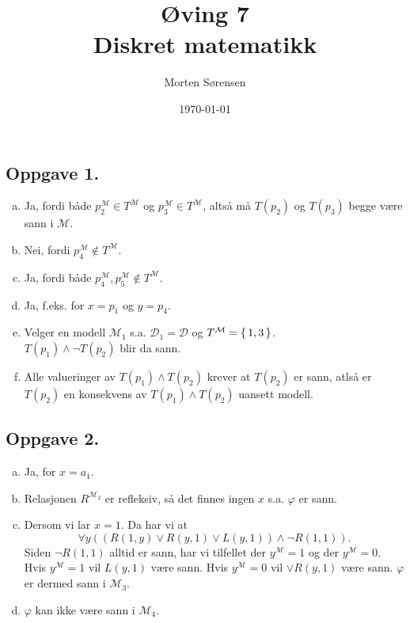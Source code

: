 \documentclass{article}
\title{\huge{Øving 7\\ Diskret matematikk}}
\author{Morten Sørensen}
\date{\today}
\begin{document}
\maketitle

\subsection*{Oppgave 1.}
\begin{enumerate}[(a)]
    \item {
        Ja, fordi både $p_2^{\mathcal{M}} \in T^{\mathcal{M}}$ og 
        $p_3^{\mathcal{M}} \in T^{\mathcal{M}}$, altså må $T(p_2)$ og $T(p_3)$ begge 
        være sann i $\mathcal{M}$.
    }
    \item {
        Nei, fordi $p_4^{\mathcal{M}} \notin T^{\mathcal{M}}$.
    }
    \item {
        Ja, fordi både $p_4^{\mathcal{M}}, p_5^{\mathcal{M}} \notin T^{\mathcal{M}}$.
    }
    \item {
        Ja, f.eks. for $x = p_1$ og $y = p_4$.
    }
    \item {
        Velger en modell $\mathcal{M}_1$ s.a. $\mathcal{D}_1 = \mathcal{D}$ og $T^{\mathcal{M}} = \set{1, 3}$. \\
        $T(p_1) \wedge \neg T(p_2)$ blir da sann.
    }
    \item {
        Alle valueringer av $T(p_1) \wedge T(p_2)$ krever at $T(p_2)$ er sann, atlså er $T(p_2)$ en 
        konsekvens av $T(p_1) \wedge T(p_2)$ uansett modell.
    }
\end{enumerate}

\subsection*{Oppgave 2.}
\begin{enumerate}[(a)]
    \item {
        Ja, for $x = a_1$.
    }
    \item {
        Relasjonen $R^{\mathcal{M}_2}$ er refleksiv, så det finnes ingen $x$ s.a. $\varphi$ er sann.
    }
    \item {
        Dersom vi lar $x = 1$. Da har vi at 
        $$\forall y ((R(1, y) \vee R(y, 1) \vee L(y, 1)) \wedge \neg R(1, 1)) \text{.}$$
        Siden $\neg R(1, 1)$ alltid er sann, har vi tilfellet der $y^{\mathcal{M}} = 1$ og der 
        $y^{\mathcal{M}} = 0$. Hvis $y^{\mathcal{M}} = 1$ vil $L(y, 1)$ være sann. Hvis 
        $y^{\mathcal{M}} = 0$ vil $\vee R(y, 1)$ være sann. $\varphi$ er dermed sann i $\mathcal{M}_3$.
    }
    \item {
        $\varphi$ kan ikke være sann i $\mathcal{M}_4$.
    }
\end{enumerate}
\end{document}
